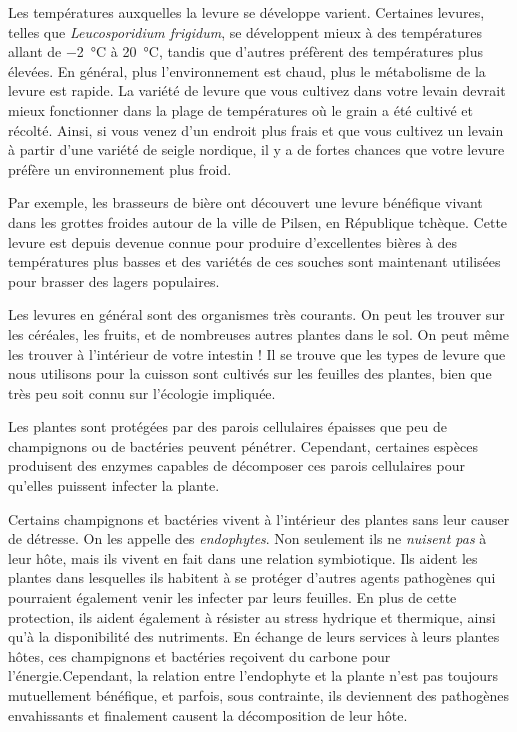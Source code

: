 Les températures auxquelles la levure se développe varient. Certaines levures, telles que \emph{Leucosporidium frigidum}, se développent mieux à des températures allant de \qty{-2}{\degreeCelsius} à \qty{20}{\degreeCelsius}, tandis que d'autres préfèrent des températures plus élevées. En général, plus l'environnement est chaud, plus le métabolisme de la levure est rapide. La variété de levure que vous cultivez dans votre levain devrait mieux fonctionner dans la plage de températures où le grain a été cultivé et récolté. Ainsi, si vous venez d'un endroit plus frais et que vous cultivez un levain à partir d'une variété de seigle nordique, il y a de fortes chances que votre levure préfère un environnement plus froid.

Par exemple, les brasseurs de bière ont découvert une levure bénéfique vivant dans les grottes froides autour de la ville de Pilsen, en République tchèque. Cette levure est depuis devenue connue pour produire d'excellentes bières à des températures plus basses et des variétés de ces souches sont maintenant utilisées pour brasser des lagers populaires.

Les levures en général sont des organismes très courants. On peut les trouver sur les céréales, les fruits, et de nombreuses autres plantes dans le sol. On peut même les trouver à l'intérieur de votre intestin ! Il se trouve que les types de levure que nous utilisons pour la cuisson sont cultivés sur les feuilles des plantes, bien que très peu soit connu sur l'écologie impliquée.

Les plantes sont protégées par des parois cellulaires épaisses que peu de champignons ou de bactéries peuvent pénétrer. Cependant, certaines espèces produisent des enzymes capables de décomposer ces parois cellulaires pour qu'elles puissent infecter la plante.

Certains champignons et bactéries vivent à l'intérieur des plantes sans leur causer de détresse. On les appelle des \emph{endophytes}. Non seulement ils ne \emph{nuisent pas} à leur hôte, mais ils vivent en fait dans une relation symbiotique. Ils aident les plantes dans lesquelles ils habitent à se protéger d'autres agents pathogènes qui pourraient également venir les infecter par leurs feuilles. En plus de cette protection, ils aident également à résister au stress hydrique et thermique, ainsi qu'à la disponibilité des nutriments. En échange de leurs services à leurs plantes hôtes, ces champignons et bactéries reçoivent du carbone pour l'énergie.Cependant, la relation entre l'endophyte et la plante n'est pas toujours mutuellement bénéfique, et parfois, sous contrainte, ils deviennent des pathogènes envahissants et finalement causent la décomposition de leur hôte.

